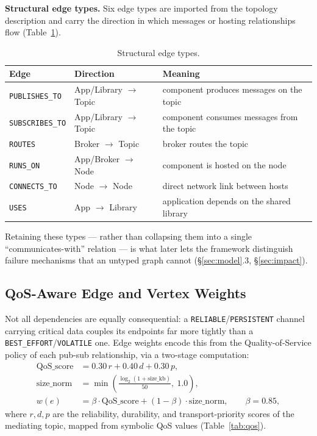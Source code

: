 \documentclass[review]{elsarticle}
\begin{document}
\textbf{Structural edge types.} Six edge types are imported from the topology description and carry
the direction in which messages or hosting relationships flow (Table~\ref{tab:edgetypes}).

\begin{table}[h]
\centering
\caption{Structural edge types.}
\label{tab:edgetypes}
\begin{tabular}{@{}p{3.2cm}p{2.8cm}p{6cm}@{}}
\toprule
Edge & Direction & Meaning \\
\midrule
\texttt{PUBLISHES\_TO} & App/Library $\to$ Topic & component produces messages on the topic \\
\texttt{SUBSCRIBES\_TO} & App/Library $\to$ Topic & component consumes messages from the topic \\
\texttt{ROUTES} & Broker $\to$ Topic & broker routes the topic \\
\texttt{RUNS\_ON} & App/Broker $\to$ Node & component is hosted on the node \\
\texttt{CONNECTS\_TO} & Node $\to$ Node & direct network link between hosts \\
\texttt{USES} & App $\to$ Library & application depends on the shared library \\
\bottomrule
\end{tabular}
\end{table}

Retaining these types --- rather than collapsing them into a single ``communicates-with'' relation
--- is what later lets the framework distinguish failure mechanisms that an untyped graph cannot
(\S\ref{sec:model}.3, \S\ref{sec:impact}).

\subsection{QoS-Aware Edge and Vertex Weights}

Not all dependencies are equally consequential: a \texttt{RELIABLE}/\texttt{PERSISTENT} channel
carrying critical data couples its endpoints far more tightly than a
\texttt{BEST\_EFFORT}/\texttt{VOLATILE} one. Edge weights encode this from the Quality-of-Service
policy of each pub-sub relationship, via a two-stage computation:
\begin{align}
\text{QoS\_score} &= 0.30\,r + 0.40\,d + 0.30\,p, \\
\text{size\_norm} &= \min\!\left(\frac{\log_2(1 + \text{size\_kb})}{50},\ 1.0\right), \\
w(e) &= \beta\cdot\text{QoS\_score} + (1-\beta)\cdot\text{size\_norm}, \qquad \beta = 0.85,
\end{align}
where $r, d, p$ are the reliability, durability, and transport-priority scores of the mediating
topic, mapped from symbolic QoS values (Table~\ref{tab:qos}).
\end{document}
